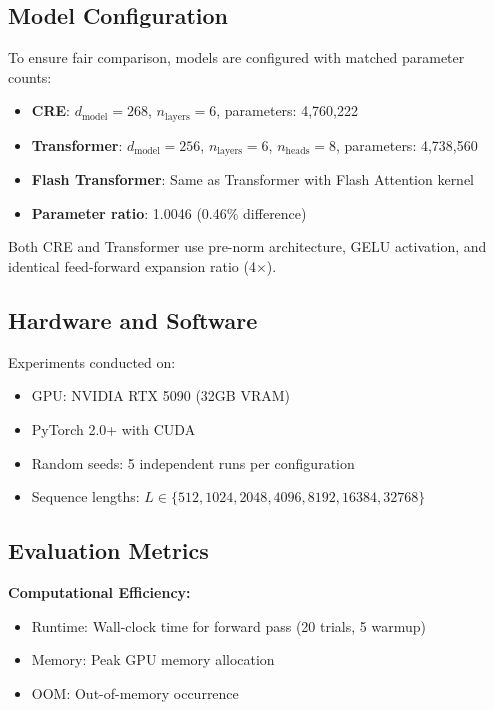 \documentclass{article}
\begin{document}
\subsection{Model Configuration}

To ensure fair comparison, models are configured with matched parameter counts:

\begin{itemize}
\item \textbf{CRE}: $d_{\text{model}}=268$, $n_{\text{layers}}=6$, parameters: 4,760,222
\item \textbf{Transformer}: $d_{\text{model}}=256$, $n_{\text{layers}}=6$, $n_{\text{heads}}=8$, parameters: 4,738,560
\item \textbf{Flash Transformer}: Same as Transformer with Flash Attention kernel
\item \textbf{Parameter ratio}: 1.0046 (0.46\% difference)
\end{itemize}

Both CRE and Transformer use pre-norm architecture, GELU activation, and identical feed-forward expansion ratio (4$\times$).

\subsection{Hardware and Software}

Experiments conducted on:
\begin{itemize}
\item GPU: NVIDIA RTX 5090 (32GB VRAM)
\item PyTorch 2.0+ with CUDA
\item Random seeds: 5 independent runs per configuration
\item Sequence lengths: $L \in \{512, 1024, 2048, 4096, 8192, 16384, 32768\}$
\end{itemize}

\subsection{Evaluation Metrics}

\textbf{Computational Efficiency:}
\begin{itemize}
\item Runtime: Wall-clock time for forward pass (20 trials, 5 warmup)
\item Memory: Peak GPU memory allocation
\item OOM: Out-of-memory occurrence
\end{itemize}
\end{document}
